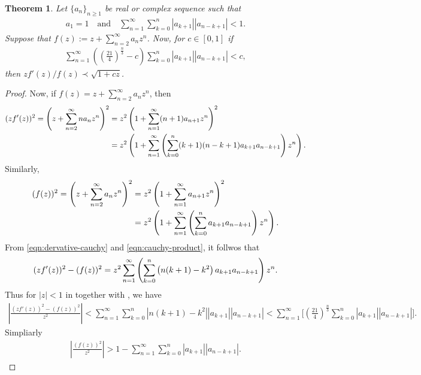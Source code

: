 \documentclass[a4paper,11pt,reqno]{amsart}
\newtheorem{theorem}{Theorem}[section]
\begin{document}
\begin{theorem}\label{thm:anlytic-LS}
    Let $\{a_n\}_{n\ge 1}$ be real or complex sequence such that 
    \begin{align}\label{eqn:hypo-1-thm1}
a_1=1 \quad \text{and} \quad \sum_{n=1}^{\infty} \sum_{k=0}^n |a_{k+1}|  |a_{n-k+1}|<1.
\end{align}
Suppose that $f(z):= z+ \sum_{n=2}^{\infty} a_n z^n$. Now, for $c \in [0, 1]$ if
\begin{align}\label{eqn:hypo-thm1}
\sum_{n=1}^{\infty} \left( \left(\tfrac{21}{4}\right)^{\tfrac{n}{3}}- c\right) \sum_{k=0}^n  |a_{k+1}|  |a_{n-k+1}| < c, 
\end{align}
then $z f'(z)/ f(z)\prec \sqrt{1+ cz}$. 
\end{theorem}
\begin{proof}
    Now, if $f(z)= z+ \sum_{n=2}^{\infty} a_n z^n$, then 
\begin{align}\label{eqn:dervative-cauchy}\notag
  ( z f'(z) )^2 = \left(z+ \sum_{n=2}^{\infty} n a_n z^n\right)^2 
  &= z^2\left( 1+ \sum_{n=1}^{\infty} (n+1) a_{n+1} z^n\right)^2\\
  &= z^2 \left( 1+ \sum_{n=1}^{\infty} \left(\sum_{k=0}^n (k+1) (n-k+1) a_{k+1}  a_{n-k+1}\right)z^n\right).
\end{align}
Similarly,
\begin{align}\label{eqn:cauchy-product}\notag
  ( f(z) )^2 = \left(z+ \sum_{n=2}^{\infty}  a_n z^n\right)^2 
  &= z^2\left( 1+ \sum_{n=1}^{\infty}  a_{n+1} z^n\right)^2\\
  &= z^2 \left( 1+ \sum_{n=1}^{\infty} \left(\sum_{k=0}^n  a_{k+1}  a_{n-k+1}\right)z^n\right).
\end{align}
From \eqref{eqn:dervative-cauchy} and \eqref{eqn:cauchy-product}, it follwos that 
\begin{align}\label{eqn:dervative-cauchy-2}\notag
  ( z f'(z) )^2- ( f(z) )^2 = z^2  \sum_{n=1}^{\infty} \left(\sum_{k=0}^n \left(n(k+1) -k^2\right) a_{k+1}  a_{n-k+1}\right)z^n.
\end{align}
Thus for $|z|<1$ in together with , we have
\begin{align*}
   \left|\frac{( z f'(z) )^2- ( f(z) )^2} {z^2}\right| < \sum_{n=1}^{\infty} \sum_{k=0}^n \left|n(k+1) -k^2\right| |a_{k+1}|  |a_{n-k+1}|< \sum_{n=1}^{\infty}\bigg[\left(\frac{21}{4}\right)^{\tfrac{n}{3}} \sum_{k=0}^n  |a_{k+1}|  |a_{n-k+1}|\bigg].
\end{align*}
Simpliarly
\begin{align*}
   \left|\frac{( f(z) )^2} {z^2}\right| >1- \sum_{n=1}^{\infty} \sum_{k=0}^n |a_{k+1}|  |a_{n-k+1}|.

\end{align*}
\end{proof}
\end{document}
